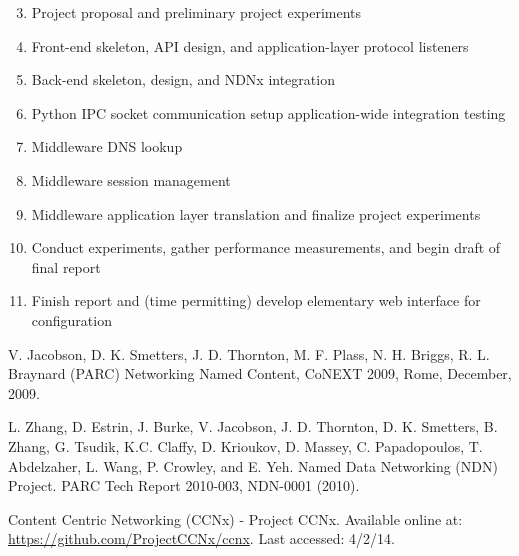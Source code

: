 \documentclass[10pt]{article}
\begin{document}
\begin{enumerate}[{\bf Week} 1:]
	\setcounter{enumi}{2}
	\item Project proposal and preliminary project experiments
	\item Front-end skeleton, API design, and application-layer protocol listeners
	\item Back-end skeleton, design, and NDNx integration
	\item Python IPC socket communication setup application-wide integration testing
	\item Middleware DNS lookup
	\item Middleware session management
	\item Middleware application layer translation and finalize project experiments
	\item Conduct experiments, gather performance measurements, and begin draft of final report 
	\item Finish report and (time permitting) develop elementary web interface for configuration
\end{enumerate}


\begin{thebibliography}{[MT1]}

 V. Jacobson, D. K. Smetters, J. D. Thornton, M. F. Plass, N. H. Briggs, R. L. Braynard (PARC) Networking Named Content, CoNEXT 2009, Rome, December, 2009.

 L. Zhang, D. Estrin, J. Burke, V. Jacobson, J. D. Thornton, D. K. Smetters, B. Zhang, G. Tsudik, K.C. Claffy, D. Krioukov, D. Massey, C. Papadopoulos, T. Abdelzaher, L. Wang, P. Crowley, and E. Yeh. Named Data Networking (NDN) Project. PARC Tech Report 2010-003, NDN-0001 (2010).

 Content Centric Networking (CCNx) - Project CCNx. Available online at: \url{https://github.com/ProjectCCNx/ccnx}. Last accessed: 4/2/14.

\end{thebibliography}
\end{document}
